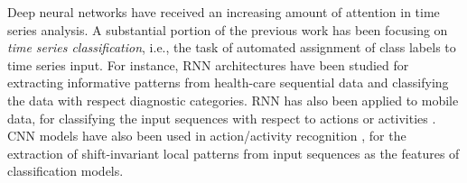     
Deep neural networks have received an increasing amount of attention in time series analysis. A substantial portion of the previous work has been focusing on \textit{time series classification}, i.e., the task of automated assignment of class labels to time series input. For instance, RNN architectures have been studied for extracting informative patterns from health-care sequential data \cite{lipton2015learning,che2016recurrent} and classifying the data with respect diagnostic categories.  RNN has also been applied to mobile data, for classifying the input sequences with respect to actions or activities \cite{hammerla2016deep}. CNN models have also been used in action/activity recognition \cite{lea2016temporal,yang2015deep,hammerla2016deep}, for the extraction of shift-invariant local patterns from input sequences as the features of classification models.

